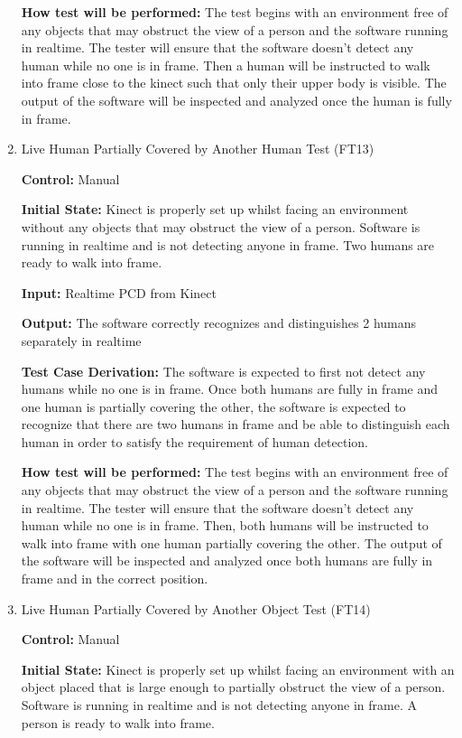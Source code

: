 \documentclass[12pt, titlepage]{article}
\begin{document}
\begin{enumerate}
\textbf{How test will be performed:} The test begins with an environment free of any objects that may obstruct the view of a person and the software running in realtime. The tester will ensure that the software doesn't detect any human while no one is in frame. Then a human will be instructed to walk into frame close to the kinect such that only their upper body is visible. The output of the software will be inspected and analyzed once the human is fully in frame. 
	
\item{Live Human Partially Covered by Another Human Test (FT13)\label{FT13}\\}

\textbf{Control:} Manual

\textbf{Initial State:} Kinect is properly set up whilst facing an environment without any objects that may obstruct the view of a person. Software is running in realtime and is not detecting anyone in frame. Two humans are ready to walk into frame.

\textbf{Input:} Realtime PCD from Kinect

\textbf{Output:} The software correctly recognizes and distinguishes 2 humans separately in realtime

\textbf{Test Case Derivation:} The software is expected to first not detect any humans while no one is in frame. Once both humans are fully in frame and one human is partially covering the other, the software is expected to recognize that there are two humans in frame and be able to distinguish each human in order to satisfy the requirement of human detection.

\textbf{How test will be performed:} The test begins with an environment free of any objects that may obstruct the view of a person and the software running in realtime. The tester will ensure that the software doesn't detect any human while no one is in frame. Then, both humans will be instructed to walk into frame with one human partially covering the other. The output of the software will be inspected and analyzed once both humans are fully in frame and in the correct position.

\item{Live Human Partially Covered by Another Object Test (FT14)\label{FT14}\\}

\textbf{Control:} Manual

\textbf{Initial State:} Kinect is properly set up whilst facing an environment with an object placed that is large enough to partially obstruct the view of a person. Software is running in realtime and is not detecting anyone in frame. A person is ready to walk into frame.


\end{enumerate}
\end{document}
